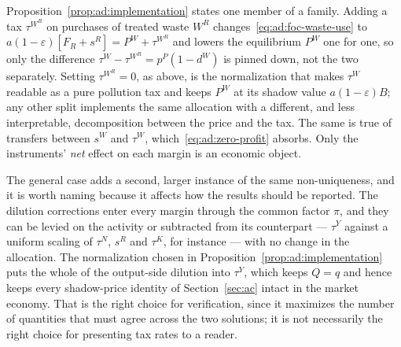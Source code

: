 \begin{remark}\label{rem:ad:normalization}
Proposition~\ref{prop:ad:implementation} states one member of a family. Adding a tax $\tau^{W^R}$ on purchases of treated waste $W^R$ changes~\eqref{eq:ad:foc-waste-use} to $a(1-\varepsilon)\left[F_R+s^R\right]=P^W+\tau^{W^R}$ and lowers the equilibrium $P^W$ one for one, so only the difference $\tau^W-\tau^{W^R}=p^P\left(1-d^W\right)$ is pinned down, not the two separately. Setting $\tau^{W^R}=0$, as above, is the normalization that makes $\tau^W$ readable as a pure pollution tax and keeps $P^W$ at its shadow value $a(1-\varepsilon)B$; any other split implements the same allocation with a different, and less interpretable, decomposition between the price and the tax. The same is true of transfers between $s^W$ and $\tau^W$, which~\eqref{eq:ad:zero-profit} absorbs. Only the instruments' \emph{net} effect on each margin is an economic object.

The general case adds a second, larger instance of the same non-uniqueness, and it is worth naming because it affects how the results should be reported. The dilution corrections enter every margin through the common factor $\pi$, and they can be levied on the activity or subtracted from its counterpart --- $\tau^Y$ against a uniform scaling of $\tau^N$, $s^R$ and $\tau^K$, for instance --- with no change in the allocation. The normalization chosen in Proposition~\ref{prop:ad:implementation} puts the whole of the output-side dilution into $\tau^Y$, which keeps $Q=q$ and hence keeps every shadow-price identity of Section~\ref{sec:ac} intact in the market economy. That is the right choice for verification, since it maximizes the number of quantities that must agree across the two solutions; it is not necessarily the right choice for presenting tax rates to a reader.
\end{remark}
